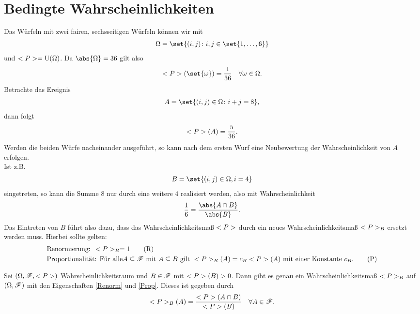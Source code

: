 \section{Bedingte Wahrscheinlichkeiten}
\begin{example}
	Das Würfeln mit zwei fairen, sechsseitigen Würfeln können wir mit 
	\begin{align}
		\O = \set{(i,j) \colon i,j \in \set{1,\dots,6}}\notag
	\end{align}
	und $\P = \Gleich(\O)$. Da $\abs{\O} = 36$ gilt also
	\begin{align}
		\P(\set{\omega}) = \frac{1}{36} \quad \forall \omega \in \O.\notag
	\end{align}
	Betrachte das Ereignis
	\begin{align}
		A = \set{(i,j) \in \O \colon i + j = 8},\notag
	\end{align}
	dann folgt
	\begin{align}
		\P(A) = \frac{5}{36}.\notag
	\end{align}
	Werden die beiden Würfe nacheinander ausgeführt, so kann nach dem ersten Wurf eine Neubewertung der Wahrscheinlichkeit von $A$ erfolgen.\\
	Ist z.B.
	\begin{align}
		B = \set{(i,j) \in \O, i = 4}\notag
	\end{align}
	eingetreten, so kann die Summe $8$ nur durch eine weitere $4$ realisiert werden, also mit Wahrscheinlichkeit
	\begin{align}
		\frac{1}{6} = \frac{\abs{A \cap B}}{\abs{B}}.\notag 
	\end{align}
	Das Eintreten von $B$ führt also dazu, dass das Wahrscheinlichkeitsmaß $\P$ durch ein neues Wahrscheinlichkeitsmaß $\P_{B}$ ersetzt werden muss. Hierbei sollte gelten:
	\begin{align}
		 &\text{Renormierung: }\P_{B} = 1\label{Renorm}\tag{R}\\
		 &\text{Proportionalität: Für alle} A \subseteq \F \mit A \subseteq B \text{ gilt }
		 \P_{B}(A) = c_B \P(A) \text{ mit einer Konstante } c_B.\label{Prop}\tag{P}
    \end{align}
\end{example}

\begin{lemma}
	Sei $(\O, \F, \P)$ Wahrscheinlichkeitsraum und $B \in \F$ mit $\P(B) > 0$. Dann gibt es genau ein Wahrscheinlichkeitsmaß $\P_B$ auf $(\O, \F)$ mit den Eigenschaften \eqref{Renorm} und \eqref{Prop}. Dieses ist gegeben durch
	\begin{align}
		\P_{B}(A) = \frac{\P(A\cap B)}{\P(B)} \quad \forall A \in \F.\notag
	\end{align}
\end{lemma}

